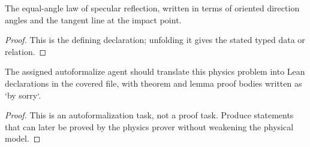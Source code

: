 \begin{definition}[ObeysSpecularReflection]
  \label{decl:physics:IPhO_2026_2_C_1:ObeysSpecularReflection}
  The equal-angle law of specular reflection, written in terms of oriented direction angles and the tangent line at the impact point.
\end{definition}
\begin{proof}
  This is the defining declaration; unfolding it gives the stated typed data or relation.
\end{proof}

\begin{theorem}
\label{thm:physics:IPhO_2026_2_C_1:target}
The assigned autoformalize agent should translate this physics problem into Lean declarations in the covered file, with theorem and lemma proof bodies written as `by sorry`.
\end{theorem}
\begin{proof}
This is an autoformalization task, not a proof task. Produce statements that can later be proved by the physics prover without weakening the physical model.
\end{proof}
